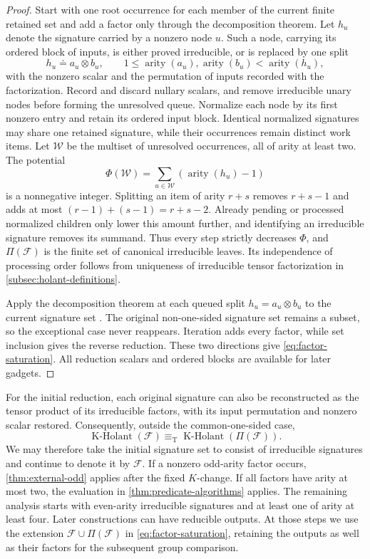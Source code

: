\documentclass[11pt,letterpaper,onecolumn]{article}
\theoremstyle{plain}
\theoremstyle{definition}
\theoremstyle{remark}
\newcommand{\cF}{\mathcal F}
\newcommand{\KHolant}{\operatorname{K\text{-}Holant}}
\newcommand{\arity}{\operatorname{arity}}
\newcommand{\equivT}{\equiv_{\mathrm T}}
\begin{document}
\begin{proof}
Start with one root occurrence for each member of the current
finite retained set and add a factor only through the decomposition theorem.  Let \(h_u\) denote the signature carried by a nonzero node \(u\).
Such a node, carrying its ordered block of inputs, is either
proved irreducible, or is replaced by one split
\[
 h_u\doteq a_u\otimes b_u,
 \qquad 1\leq\arity(a_u),\arity(b_u)<\arity(h_u),
\]
with the nonzero scalar and the permutation of inputs recorded with the factorization.
Record and discard nullary scalars, and remove irreducible unary nodes
before forming the unresolved queue. Normalize each node by its first
nonzero entry and retain its ordered input block. Identical normalized
signatures may share one retained signature, while their occurrences remain
distinct work items. Let \(\mathcal W\) be the multiset of unresolved
occurrences, all of arity at least two. The potential
\begin{equation}
  \Phi(\mathcal W)
  =
  \sum_{u\in\mathcal W}(\arity(h_u)-1)
  \label{eq:factor-potential}
\end{equation}
is a nonnegative integer. Splitting an item of arity \(r+s\) removes
\(r+s-1\) and adds at most \((r-1)+(s-1)=r+s-2\). Already pending or
processed normalized children only lower this amount further, and identifying
an irreducible signature removes its summand. Thus every step strictly
decreases \(\Phi\), and \(\Pi(\cF)\) is the finite set of canonical
irreducible leaves. Its independence of processing order follows from
uniqueness of irreducible tensor factorization in \cref{subsec:holant-definitions}.

Apply the decomposition theorem at each queued split
\(h_u=a_u\otimes b_u\) to the current signature set
\cite[full version, Theorem~32 and Remark~39]{MengWangXiaZheng2025}.
The original non-one-sided signature set remains a subset, so the
exceptional case never reappears.  Iteration adds every factor, while
set inclusion gives the reverse reduction. These two directions give
\cref{eq:factor-saturation}. All reduction scalars and ordered blocks
are available for later gadgets.
\end{proof}

For the initial reduction, each original signature can also be reconstructed
as the tensor product of its irreducible factors, with its input permutation
and nonzero scalar restored. Consequently, outside the common-one-sided
case,
\[
 \KHolant(\cF)\equivT\KHolant(\Pi(\cF)).
\]
We may therefore take the initial signature set to consist of irreducible
signatures and continue to denote it by \(\cF\). If a nonzero odd-arity
factor occurs, \cref{thm:external-odd} applies after the fixed
\(K\)-change. If all factors have arity at most two, the evaluation in
\cref{thm:predicate-algorithms} applies. The remaining analysis starts with
even-arity irreducible signatures and at least one of arity at least four.
Later constructions can have reducible outputs. At those steps we use the
extension \(\cF\cup\Pi(\cF)\) in \cref{eq:factor-saturation}, retaining
the outputs as well as their factors for the subsequent group comparison.
\end{document}
